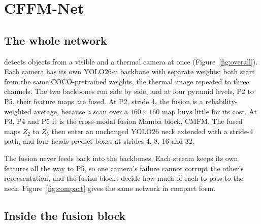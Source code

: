 \chapter{CFFM-Net}\label{ch:cffm}

\section{The whole network}

\method{} detects objects from a visible and a thermal camera at once (Figure~\ref{fig:overall}). Each camera has
its own YOLO26-n backbone with separate weights; both start from the same COCO-pretrained weights, the thermal
image repeated to three channels. The two backbones run side by side, and at four pyramid levels, P2 to P5, their
feature maps are fused. At P2, stride 4, the fusion is a reliability-weighted average, because a scan over a
$160\times160$ map buys little for its cost. At P3, P4 and P5 it is the cross-modal fusion Mamba block, CMFM. The
fused maps $Z_2$ to $Z_5$ then enter an unchanged YOLO26 neck extended with a stride-4 path, and four heads predict
boxes at strides 4, 8, 16 and 32.


The fusion never feeds back into the backbones. Each stream keeps its own features all the way to P5, so one
camera's failure cannot corrupt the other's representation, and the fusion blocks decide how much of each to pass
to the neck. Figure~\ref{fig:compact} gives the same network in compact form.


\section{Inside the fusion block}

